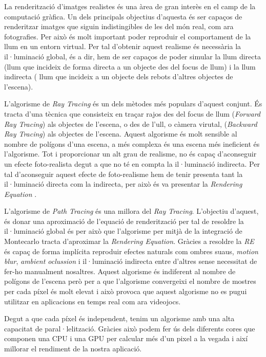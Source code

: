 \documentclass[a4paper,titlepage]{article}
\begin{document}
La renderització d'imatges realistes és una àrea de gran interès en el camp de la computació gràfica. Un dels principals objectius d'aquesta és ser capaços de renderitzar imatges que siguin indistingibles de les del món real, com ara fotografies. Per això és molt important poder reproduir el comportament de la llum en un entorn virtual. Per tal d'obtenir aquest realisme és necessària la il·luminació global, és a dir, hem de ser capaços de poder simular la llum directa (llum que incideix de forma directa a un objecte des del focus de llum) i la llum indirecta ( llum que incideix a un objecte dels rebots d'altres objectes de l'escena).

L'algorisme de \textit{Ray Tracing} és un dels mètodes més populars d'aquest conjunt. És tracta d'una tècnica que consisteix en traçar rajos des del focus de llum (\textit{Forward Ray Tracing}) als objectes de l'escena, o des de l'ull, o càmera virutal, (\textit{Backward Ray Tracing}) als objectes de l'escena. Aquest algorisme és molt sensible al nombre de polígons d'una escena, a més complexa és una escena més ineficient és l'algorisme. Tot i proporcionar un alt grau de realisme, no és capaç d'aconseguir un efecte foto-realista degut a que no té en compta la il·luminació indirecta. Per tal d'aconseguir aquest efecte de foto-realisme hem de tenir presenta tant la il·luminació directa com la indirecta, per això és va presentar la \textit{Rendering Equation} \cite{Kajiya1986}.

L'algorisme de \textit{Path Tracing} és una millora del \textit{Ray Tracing}. L'objectiu d'aquest, és donar una aproximació de l'equació de renderització per tal de resoldre la il·luminació global és per això que l'algorisme per mitjà de la integració de Montecarlo tracta d'aproximar la \textit{Rendering Equation}. Gràcies a resoldre la \textit{RE} és capaç de forma implícita reproduir efectes naturals com ombres suaus, \textit{motion blur}, \textit{ambient oclussion} i il·luminació indirecta entre d'altres sense necessitat de fer-ho manualment nosaltres. Aquest algorisme és indiferent al nombre de polígons de l'escena però per a que l'algorisme convergeixi el nombre de mostres per cada píxel és molt elevat i això provoca que aquest algorisme no es pugui utilitzar en aplicacions en temps real com ara videojocs.

Degut a que cada píxel és independent, tenim un algorisme amb una alta capacitat de paral·lelització. Gràcies això podem fer ús dels diferents cores que componen una CPU i una GPU per calcular més d'un pixel a la vegada i així millorar el rendiment de la nostra aplicació.
\end{document}
